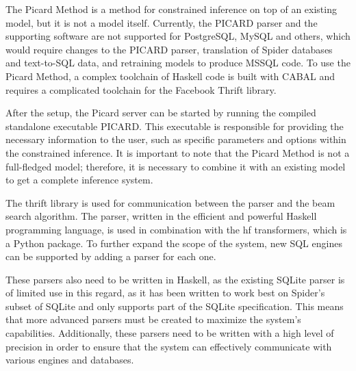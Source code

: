 The Picard Method is a method for constrained inference on top of an existing model, but it is not a model itself. Currently, the PICARD parser and the supporting software are not supported for PostgreSQL, MySQL and others, which would require changes to the PICARD parser, translation of Spider databases and text-to-SQL data, and retraining models to produce MSSQL code. To use the Picard Method, a complex toolchain of Haskell code is built with CABAL and requires a complicated toolchain for the Facebook Thrift library.

After the setup, the Picard server can be started by running the compiled standalone executable PICARD. This executable is responsible for providing the necessary information to the user, such as specific parameters and options within the constrained inference. It is important to note that the Picard Method is not a full-fledged model; therefore, it is necessary to combine it with an existing model to get a complete inference system.

The thrift library is used for communication between the parser and the beam search algorithm. The parser, written in the efficient and powerful Haskell programming language, is used in combination with the hf transformers, which is a Python package. To further expand the scope of the system, new SQL engines can be supported by adding a parser for each one.

These parsers also need to be written in Haskell, as the existing SQLite parser is of limited use in this regard, as it has been written to work best on Spider's subset of SQLite and only supports part of the SQLite specification. This means that more advanced parsers must be created to maximize the system's capabilities. Additionally, these parsers need to be written with a high level of precision in order to ensure that the system can effectively communicate with various engines and databases.